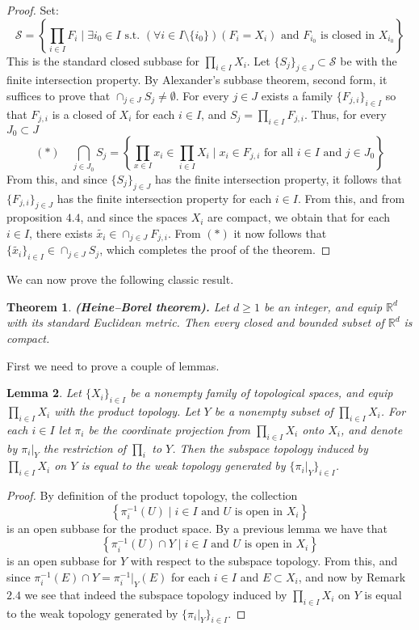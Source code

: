 \documentclass[11pt,a4paper]{article}
\theoremstyle{definition}
\theoremstyle{plain}
\newtheorem{theorem}{Theorem}[section]
\newtheorem{lemma}[theorem]{Lemma}
\newcommand{\st}{\text{ s.t. }}
\newcommand{\R}{\mathbb{R}}
\newcommand{\set}[2]{ \left\{ #1 \mid #2 \right\} }
\renewcommand{\tt}[1]{\textnormal{\textbf{(#1).}}} %
\begin{document}
  \begin{proof}
    Set:
    \[
      \mathcal{S} = 
      \left\{\prod_{i \in I}{F_i} \mid \exists i_0 \in I \st
      (\forall i \in I \setminus \{i_0\})(F_i = X_i) \text{ and }
      F_{i_0} \text{ is closed in } X_{i_0}
      \right\}
    \]
    This is the standard closed subbase for $\prod_{i \in I}{X_i}$.
    Let $\{S_j\}_{j \in J} \subset \mathcal{S}$ be with the finite
    intersection property. By Alexander's subbase theorem, second form, 
    it suffices to prove that $\cap_{j \in J}{S_j} \neq \emptyset$.
    For every $j \in J$ exists a family $\{F_{j,i}\}_{i \in I}$ so that
    $F_{j,i}$ is a closed of $X_i$ for each $i \in I$, and 
    $S_j = \prod_{i \in I}{F_{j,i}}$. Thus, for every $J_0 \subset J$
    \[
      (*) \quad \bigcap_{j \in J_0}{{S}_j} = 
      \set{\prod_{x \in I}{x_i} \in \prod_{i \in I}{X_i}}
      {x_i \in F_{j,i} \text{ for all $i \in I$ and $j \in J_0$}}
    \]
    From this, and since $\{S_j\}_{j \in J}$ has the finite intersection
    property, it follows that $\{F_{j,i}\}_{j \in J}$ has the finite
    intersection property for each $i \in I$. From this, and from 
    proposition $4.4$, and since the spaces $X_i$ are compact, we obtain
    that for each $i \in I$, there exists 
    $\tilde{x_i} \in \cap_{j \in J}{F_{j,i}}$. From $(*)$ it now follows
    that $\{\tilde{x_i}\}_{i \in I} \in \cap_{j \in J}{{S}_j}$, which
    completes the proof of the theorem.
  \end{proof}
  We can now prove the following classic result.
  \begin{theorem}
    \tt{Heine–Borel theorem}
    Let $d \geq 1$ be an integer, and equip $\R^d$ with its standard 
    Euclidean metric. Then every closed and bounded subset of $\R^d$ is
    compact.
  \end{theorem}
  First we need to prove a couple of lemmas.
  \begin{lemma}
    Let $\{X_i\}_{i \in I}$ be a nonempty family of topological spaces, 
    and equip $\prod_{i \in I}{X_i}$ with the product topology. Let $Y$ be 
    a nonempty subset of $\prod_{i \in I}{X_i}$. For each $i \in I$ let 
    $\pi_i$ be the coordinate projection from $\prod_{i \in I}{X_i}$ onto 
    $X_i$, and denote by $\pi_i\vert_Y$ the restriction of $\prod_i$ to $Y$.
    Then the subspace topology induced by $\prod_{i \in I}{X_i}$ on $Y$ is 
    equal to the weak topology generated by $\{\pi_i \vert_Y\}_{i \in I}$.
  \end{lemma}
  \begin{proof}
    By definition of the product topology, the collection
    \[
      \set{\pi_{i}^{-1}(U)}{\text{$i \in I$ and $U$ is open in $X_i$}}
    \]
    is an open subbase for the product space. By a previous lemma
    we have that
    \[
      \set{\pi_{i}^{-1}(U) \cap Y}
      {\text{$i \in I$ and $U$ is open in $X_i$}}
    \]
    is an open subbase for $Y$ with respect to the subspace topology.
    From this, and since $\pi_{i}^{-1}(E) \cap Y = \pi_{i}^{-1} \vert_Y(E)$
    for each $i \in I$ and $E \subset X_i$, and now by Remark $2.4$ we
    see that indeed the subspace topology induced by $\prod_{i \in I}{X_i}$ 
    on $Y$ is equal to the weak topology generated by 
    $\{\pi_i \vert_Y\}_{i \in I}$.
  \end{proof}
\end{document}
